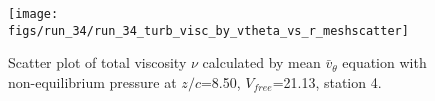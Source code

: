 \begin{figure}[H]
\centering
\texttt{[image: figs/run\_34/run\_34\_turb\_visc\_by\_vtheta\_vs\_r\_meshscatter]}
\caption{Scatter plot of total viscosity $\nu$ calculated by mean $\bar{v}_{\theta}$ equation with non-equilibrium pressure at $z/c$=8.50, $V_{free}$=21.13, station 4.}
\label{fig:run_34_turb_visc_by_vtheta_vs_r_meshscatter}
\end{figure}


